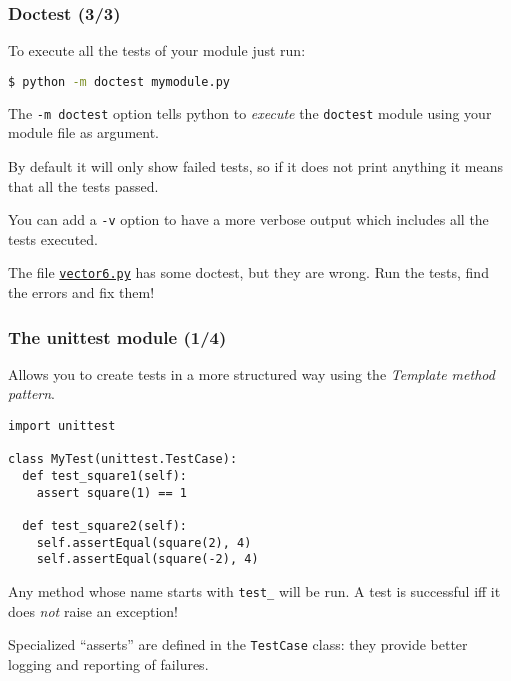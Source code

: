 \documentclass[english,serif,mathserif,xcolor=pdftex,dvipsnames,table]{beamer}
\begin{document}
\begin{frame}[fragile]
  \frametitle{Doctest (3/3)}

  To execute all the tests of your module just run:
\+
\begin{lstlisting}[language=sh]
$ python -m doctest mymodule.py
  \end{lstlisting}

  \+
  The \lstinline|-m doctest| option tells python to \textit{execute} the
  \lstinline|doctest| module using your module file as argument.

  \+
  By default it will only show failed tests, so if it does not print
  anything it means that all the tests passed.

  \+
  You can add a \lstinline|-v| option to have a more verbose output
  which includes all the tests executed.






\end{frame}

\begin{frame}
\+
\begin{exercise}
  The file
  \href{https://raw.github.com/gc3-uzh-ch/python-course/master/vector6.py}{\texttt{vector6.py}}
  has some doctest, but they are wrong. Run the tests, find the errors
  and fix them!
\end{exercise}

\end{frame}


\begin{frame}[fragile]
  \frametitle{The unittest module (1/4)}
  Allows you to create tests in a more structured way using the
  \textit{Template method pattern}.

  \begin{lstlisting}
import unittest

class MyTest(unittest.TestCase):
  def test_square1(self):
    assert square(1) == 1

  def test_square2(self):
    self.assertEqual(square(2), 4)
    self.assertEqual(square(-2), 4)
  \end{lstlisting}

Any method whose name starts with \lstinline|test_| will be run.
A test is successful iff it does \emph{not} raise an exception!

\+
Specialized ``asserts'' are defined in the \lstinline|TestCase|
class: they provide better logging and reporting of failures.
\end{frame}
\end{document}
